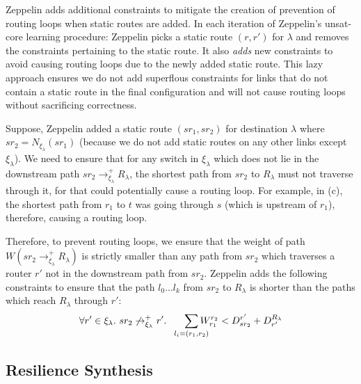 Zeppelin adds additional constraints to mitigate the creation of prevention
of routing loops when static routes are added. In each iteration of
Zeppelin's unsat-core learning procedure: 
Zeppelin picks a static route $(r, r')$
for $\lambda$ and removes the constraints pertaining to 
the static route. It also \emph{adds} new constraints to avoid
causing routing loops due to the newly added static route. This
lazy approach ensures we do not add superflous constraints for links
that do not contain a static route in the final configuration 
and will not cause routing loops without sacrificing correctness. 

Suppose, Zeppelin added a static route $(sr_1, sr_2)$ for destination
$\lambda$ where $sr_2 = N_{\xi_\lambda}(sr_1)$ (because we do not add
static routes on any other links except $\xi_\lambda$). We need to
ensure that for any switch in $\xi_\lambda$ which does not 
lie in the downstream path $sr_2 \rightarrow^+_{\xi_\lambda} R_\lambda$, 
the shortest path from $sr_2$ to $R_\lambda$ must not traverse through 
it, for that could potentially cause a routing loop. For example, in (c), the shortest path from $r_1$ to $t$ was
going through $s$ (which is upstream of $r_1$), therefore, causing 
a routing loop. 

Therefore, to prevent routing loops, we ensure that the weight
of path $W(sr_2 \rightarrow^+_{\xi_\lambda} R_\lambda)$ is 
strictly smaller than any path from $sr_2$ which traverses a
router $r'$ not in the downstream path from $sr_2$. Zeppelin
adds the following constraints to ensure that the path $l_0...l_k$
from $sr_2$ to $R_\lambda$ is shorter than the paths which reach 
$R_\lambda$ through $r'$: 
\begin{equation}
\forall r' \in \xi_\lambda. ~sr_2 \not\rightarrow_{\xi_\lambda}^+ r'. 
~~~~~\sum_{\mathclap{\substack{l_i=(r_1,r_2)}}} 
W_{r_1}^{r_2} < D^{r'}_{sr_2} + D_{r'}^{R_\lambda} 
\end{equation}

\subsection{Resilience Synthesis}
